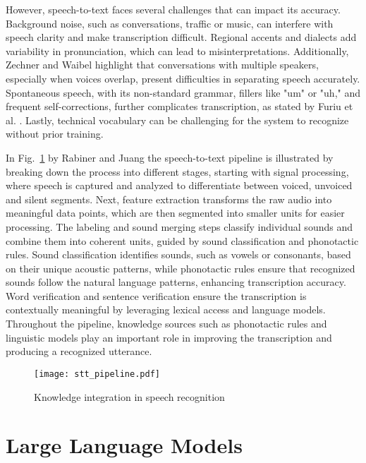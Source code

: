 However, speech-to-text faces several challenges that can impact its accuracy. Background noise, such as conversations, traffic or music, can interfere with speech clarity and make transcription difficult. Regional accents and dialects add variability in pronunciation, which can lead to misinterpretations. Additionally, Zechner and Waibel \cite{zechner20000spontaeousspeech} highlight that conversations with multiple speakers, especially when voices overlap, present difficulties in separating speech accurately. Spontaneous speech, with its non-standard grammar, fillers like "um" or "uh," and frequent self-corrections, further complicates transcription, as stated by Furiu et al. \cite{furiu2004spontaneousspeech}. Lastly, technical vocabulary can be challenging for the system to recognize without prior training.

In Fig.~\ref{fig:stt_pipeline} by Rabiner and Juang \cite{rabiner1993speechrecognition}  the speech-to-text pipeline is illustrated by breaking down the process into different stages, starting with signal processing, where speech is captured and analyzed to differentiate between voiced, unvoiced and silent segments. Next, feature extraction transforms the raw audio into meaningful data points, which are then segmented into smaller units for easier processing. The labeling and sound merging steps classify individual sounds and combine them into coherent units, guided by sound classification and phonotactic rules. Sound classification identifies sounds, such as vowels or consonants, based on their unique acoustic patterns, while phonotactic rules ensure that recognized sounds follow the natural language patterns, enhancing transcription accuracy.  Word verification and sentence verification ensure the transcription is contextually meaningful by leveraging lexical access and language models. Throughout the pipeline, knowledge sources such as phonotactic rules and linguistic models play an important role in improving the transcription and producing a recognized utterance.

\begin{figure}[htbp]
    \centering
    \texttt{[image: stt\_pipeline.pdf]}
    \caption{Knowledge integration in speech recognition \cite{rabiner1993speechrecognition}}
    \label{fig:stt_pipeline}
\end{figure}


\section{Large Language Models}


